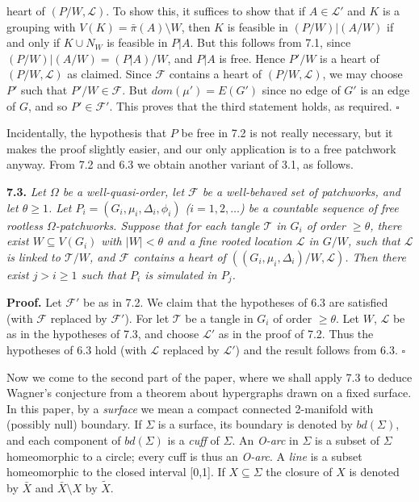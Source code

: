 \noindent heart of $(P/W, \mathcal{L})$. To show this, it suffices to show that if $A \in \mathcal{L}'$ and $K$ is a grouping with $V(K) = \bar{\pi}(A) \setminus W$, then $K$ is feasible in $(P/W)|(A/W)$ if and only if $K \cup N_W$ is feasible in $P|A$. But this follows from 7.1, since $(P/W)|(A/W) = (P|A)/W$, and $P|A$ is free. Hence $P'/W$ is a heart of $(P/W, \mathcal{L})$ as claimed. Since $\mathcal{F}$ contains a heart of $(P/W, \mathcal{L})$, we may choose $P'$ such that $P'/W \in \mathcal{F}$. But $dom(\mu') = E(G')$ since no edge of $G'$ is an edge of $G$, and so $P' \in \mathcal{F}'$. This proves that the third statement holds, as required. $\square$

Incidentally, the hypothesis that $P$ be free in 7.2 is not really necessary, but it makes the proof slightly easier, and our only application is to a free patchwork anyway. From 7.2 and 6.3 we obtain another variant of 3.1, as follows.

\textbf{7.3.} \textit{Let $\Omega$ be a well-quasi-order, let $\mathcal{F}$ be a well-behaved set of patchworks, and let $\theta \ge 1$. Let $P_i = (G_i, \mu_i, \Delta_i, \phi_i)$ ($i = 1, 2, \ldots$) be a countable sequence of free rootless $\Omega$-patchworks. Suppose that for each tangle $\mathcal{T}$ in $G_i$ of order $\ge \theta$, there exist $W \subseteq V(G_i)$ with $|W| < \theta$ and a fine rooted location $\mathcal{L}$ in $G/W$, such that $\mathcal{L}$ is linked to $\mathcal{T}/W$, and $\mathcal{F}$ contains a heart of $((G_i, \mu_i, \Delta_i)/W, \mathcal{L})$. Then there exist $j > i \ge 1$ such that $P_i$ is simulated in $P_j$.}

\textbf{Proof.} Let $\mathcal{F}'$ be as in 7.2. We claim that the hypotheses of 6.3 are satisfied (with $\mathcal{F}$ replaced by $\mathcal{F}'$). For let $\mathcal{T}$ be a tangle in $G_i$ of order $\ge \theta$. Let $W$, $\mathcal{L}$ be as in the hypotheses of 7.3, and choose $\mathcal{L}'$ as in the proof of 7.2. Thus the hypotheses of 6.3 hold (with $\mathcal{L}$ replaced by $\mathcal{L}'$) and the result follows from 6.3. $\square$


Now we come to the second part of the paper, where we shall apply 7.3 to deduce Wagner's conjecture from a theorem about hypergraphs drawn on a fixed surface. In this paper, by a \textit{surface} we mean a compact connected 2-manifold with (possibly null) boundary. If $\Sigma$ is a surface, its boundary is denoted by $bd(\Sigma)$, and each component of $bd(\Sigma)$ is a \textit{cuff} of $\Sigma$. An \textit{O-arc} in $\Sigma$ is a subset of $\Sigma$ homeomorphic to a circle; every cuff is thus an \textit{O-arc}. A \textit{line} is a subset homeomorphic to the closed interval [0,1]. If $X \subseteq \Sigma$ the closure of $X$ is denoted by $\bar{X}$ and $\bar{X} \setminus X$ by $\tilde{X}$.

